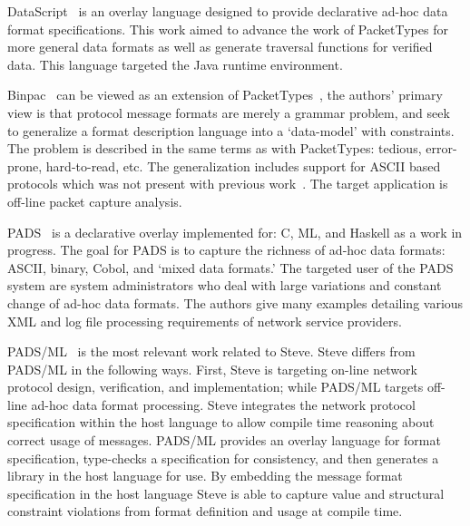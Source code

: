 DataScript~\cite{datascript} is an overlay language designed to provide
declarative ad-hoc data format specifications. This work aimed to advance the
work of PacketTypes for more general data formats as well as generate
traversal functions for verified data. This language targeted the Java
runtime environment.

Binpac~\cite{binpac} can be viewed as an extension of
PacketTypes~\cite{packet_types}, the authors' primary view is that
protocol message formats are merely a grammar problem, and seek
to generalize a format description language into a `data-model' with
constraints. The problem is described in the same terms as with PacketTypes:
tedious, error-prone, hard-to-read, etc. The generalization includes support for
ASCII based protocols which was not present with previous
work~\cite{packet_types}. The target application is off-line packet capture
analysis.

PADS~\cite{pads_orig} is a declarative overlay implemented for: C, ML, and
Haskell as a work in progress. The goal for PADS is to capture the richness
of ad-hoc data formats: ASCII, binary, Cobol, and `mixed data formats.' The
targeted user of the PADS system are system administrators who deal with large
variations and constant change of ad-hoc data formats. The authors give many
examples detailing various XML and log file processing requirements of network
service providers.

PADS/ML~\cite{pads_ml} is the most relevant work related to Steve. Steve 
differs from PADS/ML in the following ways. First, Steve is targeting on-line
network protocol design, verification, and implementation; while PADS/ML
targets off-line ad-hoc data format processing. Steve integrates the network
protocol specification within the host language to allow compile time reasoning
about correct usage of messages. PADS/ML provides an overlay language for format
specification, type-checks a specification for consistency, and then generates a
library in the host language for use. By embedding the message format 
specification in the host language Steve is able to capture value and structural
constraint violations from format definition and usage at compile time.

